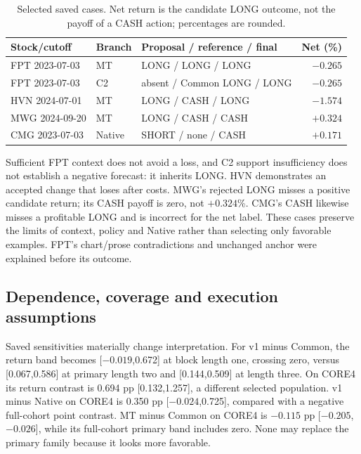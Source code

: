 \begin{table}[htbp]\centering\small{}\setlength{\tabcolsep}{4pt}
\caption[Selected adverse and policy cases]{Selected saved cases. Net return is the candidate LONG outcome,
not the payoff of a CASH action; percentages are rounded.}\label{tab:cases}
\begin{tabular}{@{}P{.25\linewidth}P{.23\linewidth}P{.29\linewidth}r@{}}\toprule
Stock/cutoff & Branch & Proposal / reference / final & Net (\%)\\\midrule
FPT 2023-07-03 & MT & LONG / LONG / LONG & $-0.265$\\
FPT 2023-07-03 & C2 & absent / Common LONG / LONG & $-0.265$\\
HVN 2024-07-01 & MT & LONG / CASH / LONG & $-1.574$\\
MWG 2024-09-20 & MT & LONG / CASH / CASH & $+0.324$\\
CMG 2023-07-03 & Native & SHORT / none / CASH & $+0.171$\\\bottomrule
\end{tabular}\end{table}

Sufficient FPT context does not avoid a loss, and C2 support insufficiency
does not establish a negative forecast: it inherits LONG. HVN demonstrates
an accepted change that loses after costs. MWG's rejected LONG misses a
positive candidate return; its CASH payoff is zero, not $+0.324$\%.
CMG's CASH likewise misses a profitable LONG and is incorrect for the
net label. These cases preserve the limits of context, policy and Native
rather than selecting only favorable examples. FPT's chart/prose
contradictions and unchanged anchor were explained before its outcome.

\subsection{Dependence, coverage and execution assumptions}
Saved sensitivities materially change interpretation. For v1 minus Common,
the return band becomes [$-0.019$,0.672] at block length one, crossing zero,
versus [0.067,0.586] at primary length two and [0.144,0.509] at length three.
On CORE4 its return contrast is 0.694 pp [0.132,1.257], a different selected
population. v1 minus Native on CORE4 is 0.350 pp [$-0.024$,0.725], compared
with a negative full-cohort point contrast. MT minus Common on CORE4 is
$-0.115$ pp [$-0.205$,$-0.026$], while its full-cohort primary band includes
zero. None may replace the primary family because it looks more favorable.

